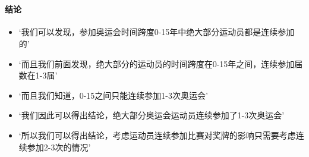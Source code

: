 \documentclass[11pt]{article}
\providecommand{\tightlist}{%
      \setlength{\itemsep}{0pt}\setlength{\parskip}{0pt}}
\begin{document}
    \begin{center}
    \end{center}
    { \hspace*{\fill} \\}
    
    \paragraph{结论}\label{ux7ed3ux8bba}

\begin{itemize}
\tightlist
\item
  `我们可以发现，参加奥运会时间跨度0-15年中绝大部分运动员都是连续参加的'
\item
  `而且我们前面发现，绝大部分的运动员的时间跨度在0-15年之间，连续参加届数在1-3届'
\item
  `而且我们知道，0-15之间只能连续参加1-3次奥运会'
\item
  `我们因此可以得出结论，绝大部分奥运会运动员连续参加了1-3次奥运会'
\item
  `所以我们可以得出结论，考虑运动员连续参加比赛对奖牌的影响只需要考虑连续参加2-3次的情况'
\end{itemize}
\end{document}
